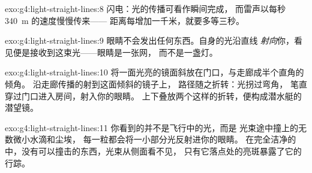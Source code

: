 \begin{solution}{exo:g4:light-straight-lines:8}
闪电：光的传播可看作瞬间完成，
而雷声以每秒 \qty{340}{m} 的速度慢慢传来——
距离每增加一千米，就要多等三秒。
\end{solution}

\begin{solution}{exo:g4:light-straight-lines:9}
眼睛不会发出任何东西。自身的光沿直线
\emph{射向}你，看见便是接收到这束光——眼睛是一张网，
而不是一盏灯。
\end{solution}

\begin{solution}{exo:g4:light-straight-lines:10}
将一面光亮的镜面斜放在门口，与走廊成半个直角的倾角。
沿走廊传播的射到这面倾斜的镜子上，
路径随之折转：光拐过弯角，
笔直穿过门口进入房间，射入你的眼睛。
上下叠放两个这样的折转，便构成潜水艇的潜望镜。
\end{solution}

\begin{solution}{exo:g4:light-straight-lines:11}
你看到的并不是飞行中的光，而是
光束途中撞上的无数微小水滴和尘埃，
每一粒都会将一小部分光反射进你的眼睛。
在完全洁净的中，没有可以撞击的东西，光束从侧面看不见，
只有它落点处的亮斑暴露了它的行踪。
\end{solution}
